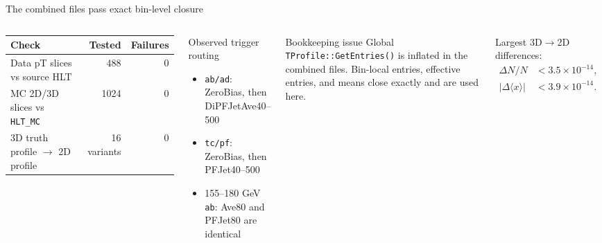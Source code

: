 \documentclass[aspectratio=169,10pt]{beamer}
\begin{document}
\begin{frame}{The combined files pass exact bin-level closure}
\begin{columns}[T,onlytextwidth]
\small
\begin{tabular}{lrr}
\toprule
Check & Tested & Failures\\
\midrule
Data pT slices vs source HLT & 488 & 0\\
MC 2D/3D slices vs \texttt{HLT\_MC} & 1024 & 0\\
3D truth profile $\rightarrow$ 2D profile & 16 variants & 0\\
\bottomrule
\end{tabular}
\vspace{0.8em}
\begin{block}{Observed trigger routing}
\begin{itemize}
\item \texttt{ab/ad}: ZeroBias, then DiPFJetAve40--500
\item \texttt{tc/pf}: ZeroBias, then PFJet40--500
\item 155--180 GeV \texttt{ab}: Ave80 and PFJet80 are identical
\end{itemize}
\end{block}
\begin{alertblock}{Bookkeeping issue}
Global \texttt{TProfile::GetEntries()} is inflated in the combined files. Bin-local entries, effective entries, and means close exactly and are used here.
\end{alertblock}
\smallskip
\small Largest 3D$\rightarrow$2D differences:
\begin{align*}
\Delta N/N &<3.5\times10^{-14},\\
|\Delta\langle x\rangle| &<3.9\times10^{-14}.
\end{align*}
\end{columns}
\end{frame}
\end{document}
